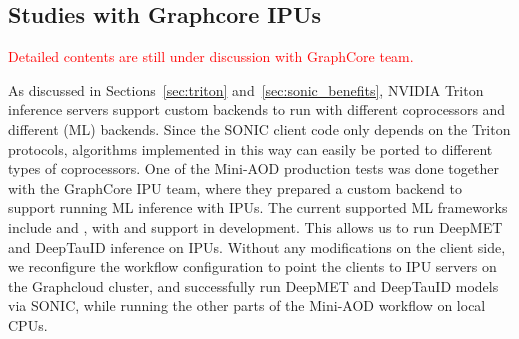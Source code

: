 \subsection{Studies with Graphcore IPUs}
\textcolor{red}{Detailed contents are still under discussion with GraphCore team.}

As discussed in Sections~\ref{sec:triton} and~\ref{sec:sonic_benefits}, NVIDIA Triton inference servers support custom backends to run with different coprocessors and different (ML) backends. Since the SONIC client code only depends on the Triton protocols, algorithms implemented in this way can easily be ported to different types of coprocessors. One of the Mini-AOD production tests was done together with the GraphCore IPU team, where they prepared a custom backend to support running ML inference with IPUs. The current supported ML frameworks include \TENSORFLOW and \PYTORCH, with \ONNX and \PYTORCHGEOMETRIC support in development. This allows us to run DeepMET and DeepTauID inference on IPUs. Without any modifications on the client side, we reconfigure the workflow configuration to point the clients to IPU servers on the Graphcloud cluster, and successfully run DeepMET and DeepTauID models via SONIC, while running the other parts of the Mini-AOD workflow on local CPUs.

